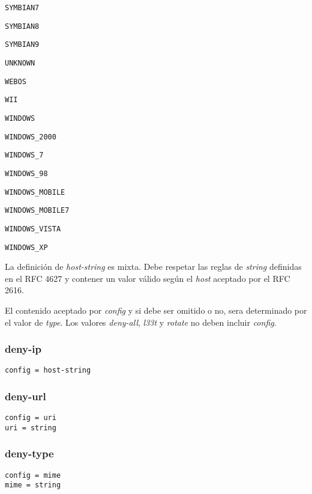 \documentclass[11pt,a4paper,titlepage]{article}
\begin{document}
\begin{multicols}{4}
    \small \texttt{SYMBIAN7}

    \small \texttt{SYMBIAN8}

    \small \texttt{SYMBIAN9}

    \small \texttt{UNKNOWN}

    \small \texttt{WEBOS}

    \small \texttt{WII}

    \small \texttt{WINDOWS}

    \small \texttt{WINDOWS\_2000}

    \small \texttt{WINDOWS\_7}

    \small \texttt{WINDOWS\_98}

    \small \texttt{WINDOWS\_MOBILE}

    \small \texttt{WINDOWS\_MOBILE7}

    \small \texttt{WINDOWS\_VISTA}

    \small \texttt{WINDOWS\_XP}

\end{multicols}


La definición de \textit{host-string} es mixta.
Debe respetar las reglas de \textit{string} definidas en el RFC 4627 y contener un valor válido según el \textit{host} aceptado por el RFC 2616.

El contenido aceptado por \textit{config} y si debe ser omitido o no, sera determinado por el valor de \textit{type}.
Los valores \textit{deny-all}, \textit{l33t} y \textit{rotate} no deben incluir \textit{config}.
\subsubsection{deny-ip}
\begin{verbatim}
config = host-string
\end{verbatim}

\subsubsection{deny-url}
\begin{verbatim}
config = uri
uri = string
\end{verbatim}

\subsubsection{deny-type}
\begin{verbatim}
config = mime
mime = string
\end{verbatim}
\end{document}
